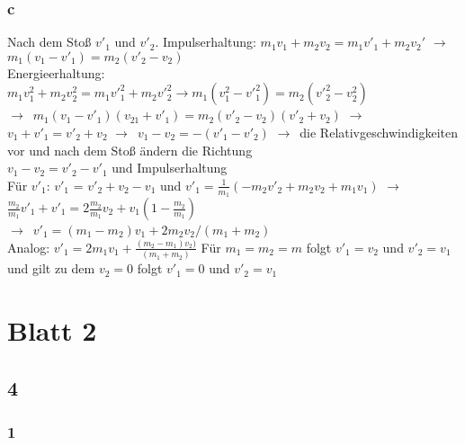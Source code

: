 \documentclass[oneside]{book}
\theoremstyle{definition}
\newcommand{\conseq}{$\rightarrow$~}
\begin{document}
\subsubsection{c}
Nach dem Stoß $v'_1$ und $v'_2$.
Impulserhaltung: $m_1v_1 +m_2v_2 = m_1v'_1+m_2v_2'$ \conseq $m_1(v_1 - v'_1) = m_2(v'_2 - v_2)$\\
Energieerhaltung: $m_1v_1^2 + m_2v_2^2 = m_1{v'}_1^2 + m_2{v'}_2^2 \rightarrow m_1(v_1^2-{v'}_1^2) = m_2({v'}_2^2 - v_2^2)$\\
\conseq $m_1(v_1-{v'}_1)(v_{21}+{v'}_1) = m_2 ({v'}_2 - v_2) ({v'}_2 + v_2)$
\conseq $v_1 + {v'}_1 = {v'}_2 + v_2$
\conseq $v_1 - v_2 = -({v'}_1 - {v'}_2)$ \conseq die Relativgeschwindigkeiten vor und nach dem Stoß ändern die Richtung\\
$v_1 - v_2 = {v'}_2-{v'}_1$ und Impulserhaltung\\
Für ${v'}_1$: ${v'}_1$ = ${v'}_2 + v_2 - v_1$ und ${v'}_1 = \frac{1}{m_1} (-m_2 {v'}_2 + m_2v_2 + m_1v_1)$ \conseq $\frac{m_2}{m_1} {v'}_1 + {v'}_1 = 2\frac{m_2}{m_1} v_2 + v_1 (1-\frac{m_2}{m_1})$\\
\conseq ${v'}_1 = (m_1 - m_2)v_1 + 2m_2v_2 / (m_1 + m_2)$\\
Analog: ${v'}_1 = 2m_1v_1 + \frac{(m_2 - m_1)v_2)}{(m_1 + m_2)}$
Für $m_1 = m_2 = m$ folgt ${v'}_1 = v_2$ und ${v'}_2 = v_1$
und gilt zu dem $v_2 = 0$ folgt ${v'}_1 = 0$ und ${v'}_2 = v_1$

\section{Blatt 2}

\subsection{4}
\subsubsection{1}
\end{document}
